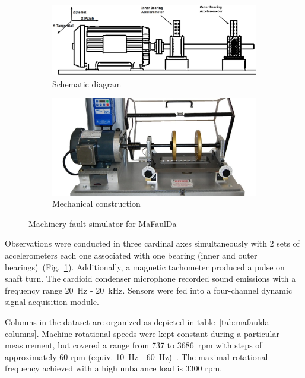\begin{figure}[h]
\centering
\begin{subfigure}[b]{0.48\textwidth}
	\includegraphics[width=\textwidth]{assets/mafaulda-simulator.png}
	\caption{Schematic diagram \cite{pestana-viana_influence_2016}}
\end{subfigure}
\hfill
\begin{subfigure}[b]{0.48\textwidth}
	\includegraphics[width=\textwidth]{assets/machinery-fault-simulator.jpg}
	\caption{Mechanical construction \cite{noauthor_spectraquest_nodate}}
\end{subfigure}
\caption{Machinery fault simulator for MaFaulDa}
\label{fig:mafaulda-simulator}
\end{figure}

Observations were conducted in three cardinal axes simultaneously with 2 sets of accelerometers each one associated with one bearing (inner and outer bearings)~(Fig.~\ref{fig:mafaulda-simulator}). Additionally, a magnetic tachometer produced a pulse on shaft turn. The cardioid condenser microphone recorded sound emissions with a frequency range 20~Hz - 20~kHz. Sensors were fed into a four-channel dynamic signal acquisition module. 

Columns in the dataset are organized as depicted in table~\ref{tab:mafaulda-columns}. Machine rotational speeds were kept constant during a particular measurement, but covered a range from 737 to 3686~rpm with steps of approximately 60 rpm (equiv. 10~Hz - 60~Hz)~\cite{pestana-viana_influence_2016}. The maximal rotational frequency achieved with a high unbalance load is 3300 rpm.


